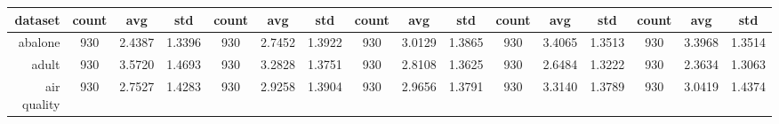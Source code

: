 \begin{table}[H]
{\begin{tabular}{rccccccccccccccc}
			\cmidrule{2-16}    \textbf{dataset} & \textbf{count}                          & \textbf{avg}                                                                       & \textbf{std}    & \textbf{count}                  & \textbf{avg}                                                              & \textbf{std}    & \textbf{count}                  & \textbf{avg}    & \textbf{std}    & \textbf{count}                  & \textbf{avg}                                                              & \textbf{std}    & \textbf{count}                  & \textbf{avg}                                                              & \textbf{std}    \\
			\midrule
			abalone                             & 930                                     & \cellcolor[rgb]{ .776,  .937,  .808}\textcolor[rgb]{ 0,  .38,  0}{2.4387}          & 1.3396          & 930                             & 2.7452                                                                    & 1.3922          & 930                             & 3.0129          & 1.3865          & 930                             & 3.4065                                                                    & 1.3513          & 930                             & 3.3968                                                                    & 1.3514          \\
			adult                               & 930                                     & 3.5720                                                                             & 1.4693          & 930                             & 3.2828                                                                    & 1.3751          & 930                             & 2.8108          & 1.3625          & 930                             & 2.6484                                                                    & 1.3222          & 930                             & \cellcolor[rgb]{ .776,  .937,  .808}\textcolor[rgb]{ 0,  .38,  0}{2.3634} & 1.3063          \\
			air quality                         & 930                                     & \cellcolor[rgb]{ .776,  .937,  .808}\textcolor[rgb]{ 0,  .38,  0}{2.7527}          & 1.4283          & 930                             & 2.9258                                                                    & 1.3904          & 930                             & 2.9656          & 1.3791          & 930                             & 3.3140                                                                    & 1.3789          & 930                             & 3.0419                                                                    & 1.4374          \\

\end{tabular}}
\end{table}

